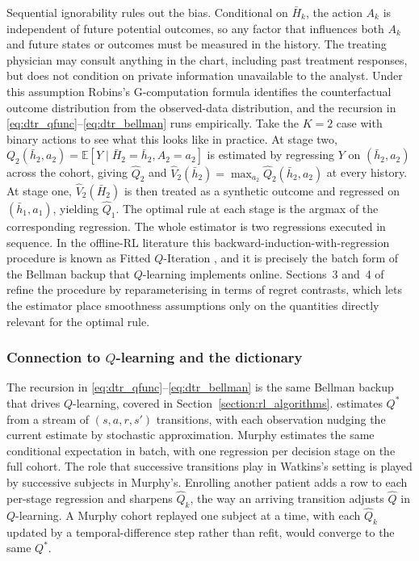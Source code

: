 Sequential ignorability rules out the bias. Conditional on $\bar H_k$, the action $A_k$ is independent of future potential outcomes, so any factor that influences both $A_k$ and future states or outcomes must be measured in the history. The treating physician may consult anything in the chart, including past treatment responses, but does not condition on private information unavailable to the analyst. Under this assumption Robins's G-computation formula identifies the counterfactual outcome distribution from the observed-data distribution, and the recursion in \eqref{eq:dtr_qfunc}--\eqref{eq:dtr_bellman} runs empirically. Take the $K = 2$ case with binary actions to see what this looks like in practice. At stage two, $Q_2(\bar h_2, a_2) = \mathbb{E}[Y \mid \bar H_2 = \bar h_2, A_2 = a_2]$ is estimated by regressing $Y$ on $(\bar h_2, a_2)$ across the cohort, giving $\hat Q_2$ and $\hat V_2(\bar h_2) = \max_{a_2} \hat Q_2(\bar h_2, a_2)$ at every history. At stage one, $\hat V_2(\bar H_2)$ is then treated as a synthetic outcome and regressed on $(\bar h_1, a_1)$, yielding $\hat Q_1$. The optimal rule at each stage is the argmax of the corresponding regression. The whole estimator is two regressions executed in sequence. In the offline-RL literature this backward-induction-with-regression procedure is known as Fitted $Q$-Iteration \citep{Ernst2005}, and it is precisely the batch form of the Bellman backup that $Q$-learning implements online. Sections~3 and~4 of \citet{murphy2003dtr} refine the procedure by reparameterising in terms of regret contrasts, which lets the estimator place smoothness assumptions only on the quantities directly relevant for the optimal rule.

\subsubsection*{Connection to $Q$-learning and the dictionary}

The recursion in \eqref{eq:dtr_qfunc}--\eqref{eq:dtr_bellman} is the same Bellman backup that drives $Q$-learning, covered in Section~\ref{section:rl_algorithms}. \citet{watkins1992_paper} estimates $Q^*$ from a stream of $(s, a, r, s')$ transitions, with each observation nudging the current estimate by stochastic approximation. Murphy estimates the same conditional expectation in batch, with one regression per decision stage on the full cohort. The role that successive transitions play in Watkins's setting is played by successive subjects in Murphy's. Enrolling another patient adds a row to each per-stage regression and sharpens $\hat Q_k$, the way an arriving transition adjusts $\hat Q$ in $Q$-learning. A Murphy cohort replayed one subject at a time, with each $\hat Q_k$ updated by a temporal-difference step rather than refit, would converge to the same $Q^*$.

